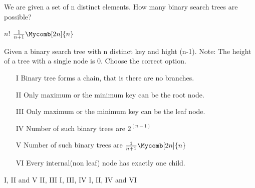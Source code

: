 \begin{questyle}
  \question  We are given a set of n distinct elements. How many binary search trees are possible?

  \begin{oneparchoices}
    \choice         \( {n!} \)
    \CorrectChoice  \( \frac{1}{n+1} \Mycomb[2n]{n} \)
  \end{oneparchoices}
\end{questyle}


\begin{questyle}
  \question Given a binary search tree with n distinct key and hight (n-1). Note: The height
            of a tree with a single node is 0. Choose the correct option.
    \begin{enumerate}
    \item[I]  Binary tree forms a chain, that is there are no branches.
    \item[II] Only maximum or the minimum key can be the root node.
    \item[III] Only maximum or the minimum key can be the leaf node.
    \item[IV] Number of such binary trees are { \Large \( 2^{(n-1)}\) }
    \item[V] Number of such binary trees are \( \frac{1}{n+1} \Mycomb[2n]{n} \)
    \item[VI] Every internal(non leaf) node has exactly one child.
    \end{enumerate}

  \begin{oneparchoices}
    \choice         I, II and V
    \choice         II, III
    \choice         I, III, IV
    \CorrectChoice  I, II, IV and VI
  \end{oneparchoices}
\end{questyle}
